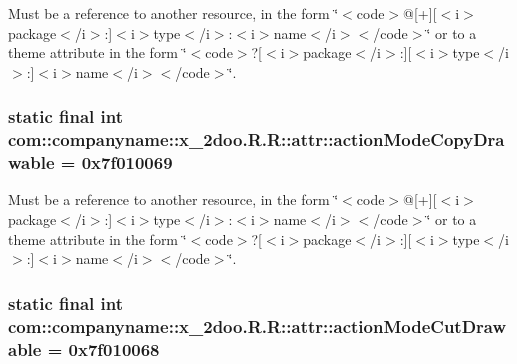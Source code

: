 Must be a reference to another resource, in the form \char`\"{}$<$code$>$@\mbox{[}+\mbox{]}\mbox{[}$<$i$>$package$<$/i$>$:\mbox{]}$<$i$>$type$<$/i$>$:$<$i$>$name$<$/i$>$$<$/code$>$\char`\"{} or to a theme attribute in the form \char`\"{}$<$code$>$?\mbox{[}$<$i$>$package$<$/i$>$:\mbox{]}\mbox{[}$<$i$>$type$<$/i$>$:\mbox{]}$<$i$>$name$<$/i$>$$<$/code$>$\char`\"{}. \hypertarget{classcom_1_1companyname_1_1x__2doo_1_1_r_1_1attr_2624652073828ad02745d5949356a277}{
\subsubsection[{actionModeCopyDrawable}]{\setlength{\rightskip}{0pt plus 5cm}static final int com::companyname::x\_\-2doo.R.R::attr::actionModeCopyDrawable = 0x7f010069}}
\label{classcom_1_1companyname_1_1x__2doo_1_1_r_1_1attr_2624652073828ad02745d5949356a277}


Must be a reference to another resource, in the form \char`\"{}$<$code$>$@\mbox{[}+\mbox{]}\mbox{[}$<$i$>$package$<$/i$>$:\mbox{]}$<$i$>$type$<$/i$>$:$<$i$>$name$<$/i$>$$<$/code$>$\char`\"{} or to a theme attribute in the form \char`\"{}$<$code$>$?\mbox{[}$<$i$>$package$<$/i$>$:\mbox{]}\mbox{[}$<$i$>$type$<$/i$>$:\mbox{]}$<$i$>$name$<$/i$>$$<$/code$>$\char`\"{}. \hypertarget{classcom_1_1companyname_1_1x__2doo_1_1_r_1_1attr_6f53e5cdd44209031ee1a63332a34c72}{
\subsubsection[{actionModeCutDrawable}]{\setlength{\rightskip}{0pt plus 5cm}static final int com::companyname::x\_\-2doo.R.R::attr::actionModeCutDrawable = 0x7f010068}}
\label{classcom_1_1companyname_1_1x__2doo_1_1_r_1_1attr_6f53e5cdd44209031ee1a63332a34c72}


